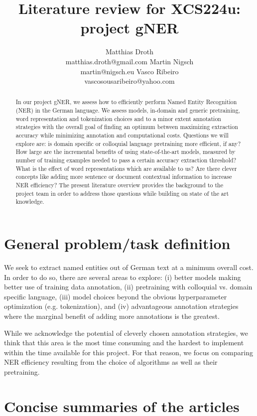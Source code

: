 \documentclass[11pt]{article}
\title{Literature review for XCS224u: project gNER}
\author{
	Matthias Droth\\
	matthias.droth@gmail.com
	\And
	Martin Nigsch\\
	martin@nigsch.eu
	\And
	Vasco Ribeiro\\
	vascosousaribeiro@yahoo.com
}
\begin{document}
\maketitle

\begin{abstract}
In our project gNER, we assess how to efficiently perform Named Entity Recognition (NER) in the German language. We assess models, in-domain and generic pretraining, word representation and tokenization choices and to a minor extent annotation strategies with the overall goal of finding an optimum between maximizing extraction accuracy while minimizing annotation and computational costs. Questions we will explore are: is domain specific or colloquial language pretraining more efficient, if any? How large are the incremental benefits of using state-of-the-art models, measured by number of training examples needed to pass a certain accuracy extraction threshold? What is the effect of word representations which are available to us? Are there clever concepts like adding more sentence or document contextual information to increase NER efficiency? The present literature overview provides the background to the project team in order to address those questions while building on state of the art knowledge.
\end{abstract}

\section{General problem/task definition}
We seek to extract named entities out of German text at a minimum overall cost. In order to do so, there are several areas to explore: (i) better models making better use of training data annotation, (ii) pretraining with colloquial vs. domain specific language, (iii)  model choices beyond the obvious hyperparameter optimization (e.g. tokenization), and (iv) advantageous annotation strategies where the marginal benefit of adding more annotations is the greatest. 

While we acknowledge the potential of cleverly chosen annotation strategies, we think that this area is the most time consuming and the hardest to implement within the time available for this project. For that reason, we focus on comparing NER efficiency resulting from the choice of algorithms as well as their pretraining. 

\section{Concise summaries of the articles}
\end{document}
